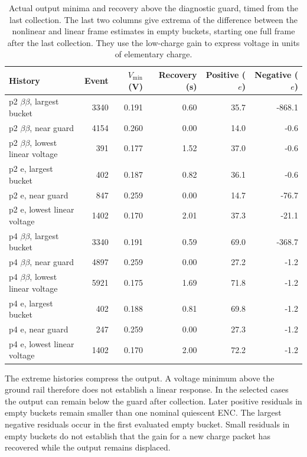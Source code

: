 \documentclass[11pt,a4paper]{article}
\begin{document}
\begin{table}[ht]\centering\scriptsize
\begin{tabular}{lrrrrr}\toprule
History & Event & $V_{\min}$ (V) & Recovery (s) & Positive ($e$) & Negative ($e$)\\\midrule
p2 $\beta\beta$, largest bucket & 3340 & 0.191 & 0.60 & 35.7 & -868.1 \\
p2 $\beta\beta$, near guard & 4154 & 0.260 & 0.00 & 14.0 & -0.6 \\
p2 $\beta\beta$, lowest linear voltage & 391 & 0.177 & 1.52 & 37.0 & -0.6 \\
p2 e, largest bucket & 402 & 0.187 & 0.82 & 36.1 & -0.6 \\
p2 e, near guard & 847 & 0.259 & 0.00 & 14.7 & -76.7 \\
p2 e, lowest linear voltage & 1402 & 0.170 & 2.01 & 37.3 & -21.1 \\
p4 $\beta\beta$, largest bucket & 3340 & 0.191 & 0.59 & 69.0 & -368.7 \\
p4 $\beta\beta$, near guard & 4897 & 0.259 & 0.00 & 27.2 & -1.2 \\
p4 $\beta\beta$, lowest linear voltage & 5921 & 0.175 & 1.69 & 71.8 & -1.2 \\
p4 e, largest bucket & 402 & 0.188 & 0.81 & 69.8 & -1.2 \\
p4 e, near guard & 247 & 0.259 & 0.00 & 27.3 & -1.2 \\
p4 e, lowest linear voltage & 1402 & 0.170 & 2.00 & 72.2 & -1.2 \\
\bottomrule\end{tabular}
\caption{Actual output minima and recovery above the diagnostic guard, timed
from the last collection. The last two columns give extrema of the difference
between the nonlinear and linear frame estimates in empty buckets, starting one
full frame after the last collection. They use the low-charge gain to express
voltage in units of elementary charge.}
\end{table}

The extreme histories compress the output. A voltage minimum above the ground
rail therefore does not establish a linear response. In the selected cases the
output can remain below the guard after collection. Later positive residuals in
empty buckets remain smaller than one nominal quiescent ENC. The largest
negative residuals occur in the first evaluated empty bucket. Small residuals
in empty buckets do not establish that the gain for a new charge packet has
recovered while the output remains displaced.
\end{document}
